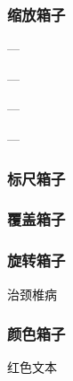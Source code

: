 \documentclass{ctexart}
\begin{document}
        \subsubsection{缩放箱子}
        {\setlength{\fboxrule}{.1pt}
        \setlength{\fboxsep}{0pt}
            \fbox{\LaTeX}---\fbox{\scalebox{-1}[1]{\LaTeX}} 

            \fbox{\LaTeX}---\fbox{\scalebox{1}[-1]{\LaTeX}} 

            \fbox{\LaTeX}---\fbox{\scalebox{-1}{\LaTeX}} 

            \fbox{\LaTeX}---\fbox{\scalebox{2}[1]{\LaTeX}}

        }
        \subsubsection{标尺箱子}

        \subsubsection{覆盖箱子}

        \subsubsection{旋转箱子}
            治颈椎病

        \subsubsection{颜色箱子}
            {\color{red}红色文本}
            
\end{document}
